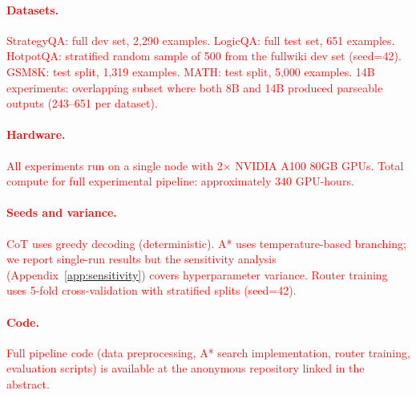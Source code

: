 \documentclass[11pt]{article}
\begin{document}
\textcolor{red}{\paragraph{Datasets.} StrategyQA: full dev set, 2{,}290 examples. LogicQA: full test set, 651 examples. HotpotQA: stratified random sample of 500 from the fullwiki dev set (seed=42). GSM8K: test split, 1{,}319 examples. MATH: test split, 5{,}000 examples. 14B experiments: overlapping subset where both 8B and 14B produced parseable outputs (243--651 per dataset).}

\textcolor{red}{\paragraph{Hardware.} All experiments run on a single node with 2$\times$ NVIDIA A100 80GB GPUs. Total compute for full experimental pipeline: approximately 340 GPU-hours.}

\textcolor{red}{\paragraph{Seeds and variance.} CoT uses greedy decoding (deterministic). A* uses temperature-based branching; we report single-run results but the sensitivity analysis (Appendix~\ref{app:sensitivity}) covers hyperparameter variance. Router training uses 5-fold cross-validation with stratified splits (seed=42).}

\textcolor{red}{\paragraph{Code.} Full pipeline code (data preprocessing, A* search implementation, router training, evaluation scripts) is available at the anonymous repository linked in the abstract.}
\end{document}
